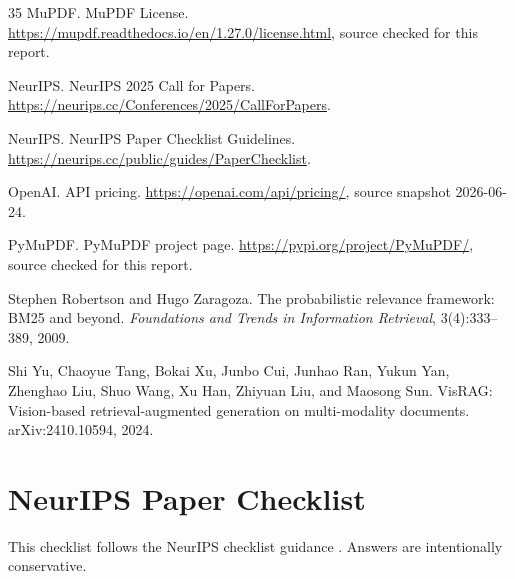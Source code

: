 \documentclass{article}
\begin{document}
\begin{thebibliography}{35}
MuPDF.
\newblock MuPDF License.
\newblock \url{https://mupdf.readthedocs.io/en/1.27.0/license.html}, source checked for this report.

NeurIPS.
\newblock NeurIPS 2025 Call for Papers.
\newblock \url{https://neurips.cc/Conferences/2025/CallForPapers}.

NeurIPS.
\newblock NeurIPS Paper Checklist Guidelines.
\newblock \url{https://neurips.cc/public/guides/PaperChecklist}.

OpenAI.
\newblock API pricing.
\newblock \url{https://openai.com/api/pricing/}, source snapshot 2026-06-24.

PyMuPDF.
\newblock PyMuPDF project page.
\newblock \url{https://pypi.org/project/PyMuPDF/}, source checked for this report.

Stephen Robertson and Hugo Zaragoza.
\newblock The probabilistic relevance framework: BM25 and beyond.
\newblock \emph{Foundations and Trends in Information Retrieval}, 3(4):333--389, 2009.

Shi Yu, Chaoyue Tang, Bokai Xu, Junbo Cui, Junhao Ran, Yukun Yan, Zhenghao Liu, Shuo Wang, Xu Han, Zhiyuan Liu, and Maosong Sun.
\newblock VisRAG: Vision-based retrieval-augmented generation on multi-modality documents.
\newblock arXiv:2410.10594, 2024.

\end{thebibliography}

\appendix





\section*{NeurIPS Paper Checklist}

This checklist follows the NeurIPS checklist guidance \citep{neuripsChecklist2025}. Answers are intentionally conservative.
\end{document}

